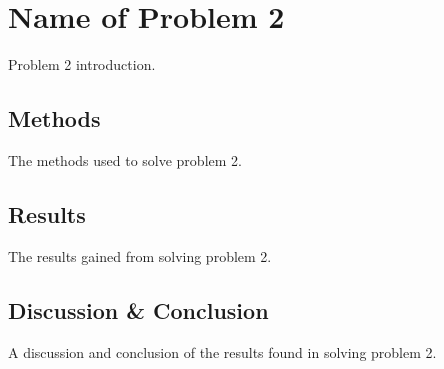 \chapter{Name of Problem 2}\label{ch:2-problem}
Problem 2 introduction.

\section{Methods}\label{sec:2-problem-method}

The methods used to solve problem 2.

\section{Results}\label{sec:2-problem-results}

The results gained from solving problem 2.

\section{Discussion \& Conclusion}\label{sec:2-problem-discussion-and-conclusion}

A discussion and conclusion of the results found in solving problem 2.
